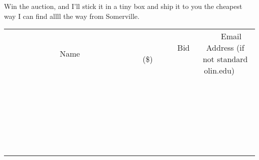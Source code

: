 \documentclass[11pt]{article}
\begin{document}
Win the auction, and I'll stick it in a tiny box and ship it to you the cheapest way I can find allll the way from Somerville.
\\[6ex]
\begin{tabular}{c c c}
~~~~~~~~~~~~~Name~~~~~~~~~~~~~ & ~~~~~~~~~Bid (\$)~~~~~~~~~  & ~~~Email Address (if not standard olin.edu)~~~\\
 & & \\
\hline
 & & \\
\hline
 & & \\
\hline
 & & \\
\hline
 & & \\
\hline
 & & \\
\hline
 & & \\
\hline
 & & \\
\hline
 & & \\
\hline
 & & \\
\hline
 & & \\
\hline
 & & \\
\hline
 & & \\
\hline
 & & \\
\hline
 & & \\
\hline
 & & \\
\hline
 & & \\
\hline
 & & \\
\hline
 & & \\
\hline
 & & \\
\hline
 & & \\
\hline
 & & \\
\hline
 & & \\
\hline
 & & \\
\hline
 & & \\
\hline
 & & \\
\hline
\end{tabular}
\newpage
\end{document}
